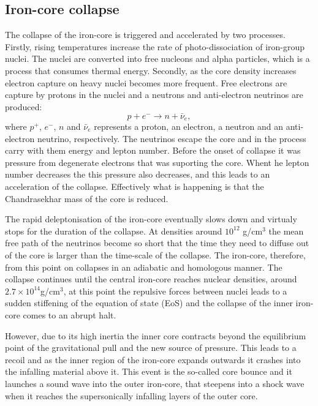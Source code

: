 \subsection{Iron-core collapse}
The collapse of the iron-core is triggered and accelerated by two processes.
Firstly, rising temperatures increase the rate of photo-dissociation of iron-group 
nuclei. The nuclei are converted into free nucleons and alpha particles,
which is a process that consumes thermal energy. Secondly, as the core density increases electron capture
on heavy nuclei becomes more frequent. Free electrons are capture by protons in the nuclei and a neutrons 
and anti-electron neutrinos are produced:
\begin{equation} \label{eqSN:ecapture}
p + e^{-} \rightarrow n + \bar{\nu}_e,
\end{equation}
where $p^{+}$, $e^{-}$, $n$ and $\bar{\nu}_e$ represents a proton, an electron, 
a neutron and an anti-electron neutrino, respectively.
The neutrinos escape the core and in the process carry with them energy
and lepton number. Before the onset of collapse it was pressure from degenerate electrons
that was suporting the core. Whent he lepton number decreases the this pressure also decreases,
and this leads to an acceleration of the collapse. Effectively what is happening is that
the Chandrasekhar mass of the core is reduced. 

The rapid deleptonisation of the iron-core eventually slows down and virtualy stops for the duration of the collapse. 
At densities around $10^{12}$ g/cm$^3$ the mean free path of the neutrinos become so short that the time they need to diffuse out of the
core is larger than the time-scale of the collapse. The iron-core, therefore, from this point on collapses in an 
adiabatic and homologous manner. The collapse continues until the central iron-core reaches nuclear densities, around $2.7 \times 10^{14} $g/cm$^3$,
at this point the repulsive forces between nuclei leads to a sudden stiffening of the equation of state (EoS) and the collapse of the
inner iron-core comes to an abrupt halt. 

However, due to its high inertia the inner core contracts beyond the equilibrium point of the
gravitational pull and the new source of pressure. This leads to a recoil and as the inner region of the iron-core expands outwards it crashes
into the infalling material above it. This event is the so-called core bounce and it launches a sound wave into the outer iron-core, that steepens into a shock wave when it reaches the supersonically infalling layers of the outer core.

